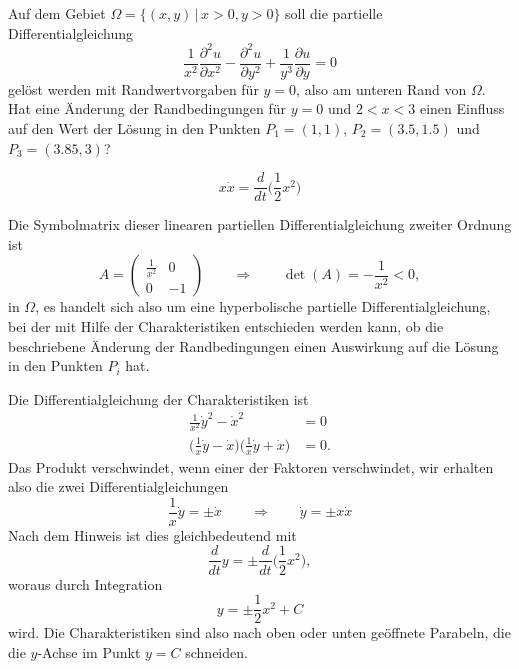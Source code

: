 Auf dem Gebiet $\Omega = \{(x,y)\,|\, x>0,y>0\}$ soll die partielle
Differentialgleichung
\begin{equation}
\frac1{x^2}\frac{\partial^2u}{\partial x^2}
-\frac{\partial^2 u}{\partial y^2}+\frac1{y^3}\frac{\partial u}{\partial y}=0
\label{90000012:equation}
\end{equation}
gelöst werden mit Randwertvorgaben für $y=0$, also am unteren Rand von
$\Omega$.
Hat eine Änderung der Randbedingungen für $y=0$ und $2<x<3$ einen Einfluss
auf den Wert der Lösung in den Punkten 
$P_1=(1,1)$, $P_2=(3.5,1.5)$ und $P_3=(3.85,3)$?

\begin{hinweis}
\[
x\dot x=\frac{d}{dt}\bigl(
{\textstyle \frac12}x^2
\bigr)
\]
\end{hinweis}

\begin{loesung}
Die Symbolmatrix dieser linearen partiellen Differentialgleichung zweiter
Ordnung ist
\[
A=\begin{pmatrix}
\frac1{x^2}&0\\0&-1
\end{pmatrix}
\qquad
\Rightarrow
\qquad
\det(A)=-\frac1{x^2}<0,
\]
in $\Omega$, es handelt sich also um eine hyperbolische partielle 
Differentialgleichung, bei der mit Hilfe der Charakteristiken
entschieden werden kann, ob die beschriebene Änderung der Randbedingungen
einen Auswirkung auf die Lösung in den Punkten $P_i$ hat.

Die Differentialgleichung der Charakteristiken ist
\begin{align*}
\frac1{x^2}\dot y^2-\dot x^2&=0
\\
\biggl(\frac1x \dot y-\dot x\biggr)
\biggl(\frac1x \dot y+\dot x\biggr)
&=0.
\end{align*}
Das Produkt verschwindet, wenn einer der Faktoren verschwindet, wir erhalten
also die zwei Differentialgleichungen
\[
\frac1x\dot y=\pm\dot x
\qquad
\Rightarrow
\qquad
\dot y=\pm x\dot x
\]
Nach dem Hinweis ist dies gleichbedeutend mit
\[
\frac{d}{dt}y
=
\pm
\frac{d}{dt}
\biggl(
\frac12
x^2
\biggr),
\]
woraus durch Integration 
\[
y=\pm\frac12x^2+C
\]
wird.
Die Charakteristiken sind also nach oben oder unten geöffnete Parabeln,
die die $y$-Achse im Punkt $y=C$ schneiden.


\end{loesung}
